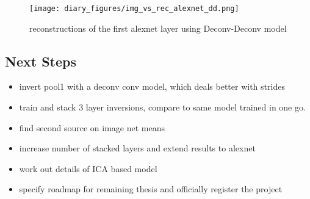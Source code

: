 \documentclass{article}
\begin{document}
\begin{figure}
    \centering
    \texttt{[image: diary\_figures/img\_vs\_rec\_alexnet\_dd.png]}
    \caption{reconstructions of the first alexnet layer using Deconv-Deconv model}
    \label{fig:alex_dd}
\end{figure}

\FloatBarrier
\subsection*{Next Steps}
\begin{itemize}
    \item invert pool1 with a deconv conv model, which deals better with strides
    \item train and stack 3 layer inversions, compare to same model trained in one go.
    \item find second source on image net means
    \item increase number of stacked layers and extend results to alexnet
    \item work out details of ICA based model
    \item specify roadmap for remaining thesis and officially register the project
\end{itemize}
\end{document}
